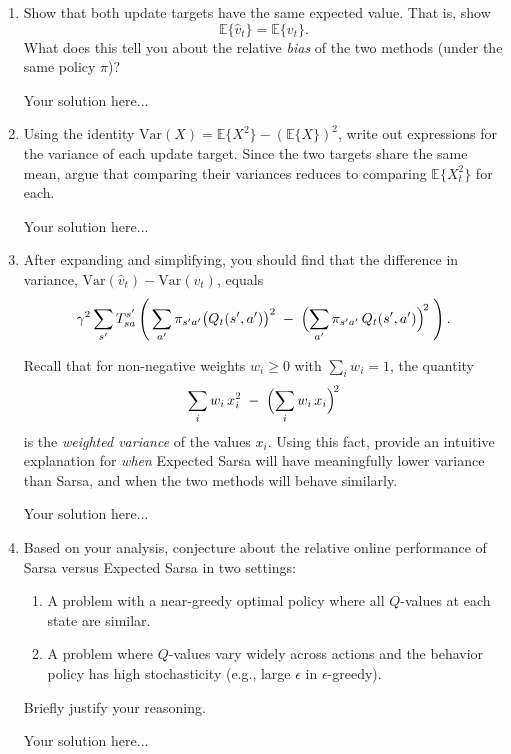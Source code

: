\documentclass[12pt]{article}
\newcommand{\E}{\mathbb{E}}
\newcommand{\Var}{\mathrm{Var}}
\newcommand*{\E}{\mathbb{E}}
\begin{document}
\begin{enumerate}[label=\textbf{(\alph*)},itemsep=12pt]

\item Show that both update targets have the same expected value.  That is, show
\[
    \E\{\hat{v}_t\} = \E\{v_t\}.
\]
What does this tell you about the relative \emph{bias} of the two methods (under the same policy $\pi$)?

\begin{solution}
    Your solution here...
\end{solution}

\item Using the identity $\Var(X) = \E\{X^2\} - (\E\{X\})^2$, write out expressions for the variance of each update target.  Since the two targets share the same mean, argue that comparing their variances reduces to comparing $\E\{X_t^2\}$ for each.

\begin{solution}
    Your solution here...
\end{solution}

\item After expanding and simplifying, you should find that the difference in variance, $\Var(\hat{v}_t) - \Var(v_t)$, equals
\[
    \gamma^2 \sum_{s'} T^{s'}_{sa} \left(\, \sum_{a'} \pi_{s'a'}\bigl(Q_t(s',a')\bigr)^2 \;-\; \Bigl(\sum_{a'} \pi_{s'a'}\, Q_t(s',a')\Bigr)^{\!2}\;\right).
\]

Recall that for non-negative weights $w_i \geq 0$ with $\sum_i w_i = 1$, the quantity
\[
    \sum_i w_i\, x_i^2 \;-\; \Bigl(\sum_i w_i\, x_i\Bigr)^{\!2}
\]
is the \emph{weighted variance} of the values $x_i$.  Using this fact, provide an intuitive explanation for \emph{when} Expected Sarsa will have meaningfully lower variance than Sarsa, and when the two methods will behave similarly.

\begin{solution}
    Your solution here...
\end{solution}

\item Based on your analysis, conjecture about the relative online performance of Sarsa versus Expected Sarsa in two settings:
\begin{enumerate}[label=(\roman*)]
    \item A problem with a near-greedy optimal policy where all $Q$-values at each state are similar.
    \item A problem where $Q$-values vary widely across actions and the behavior policy has high stochasticity (e.g., large $\epsilon$ in $\epsilon$-greedy).
\end{enumerate}
Briefly justify your reasoning.

\begin{solution}
    Your solution here...
\end{solution}

\end{enumerate}
\end{document}

